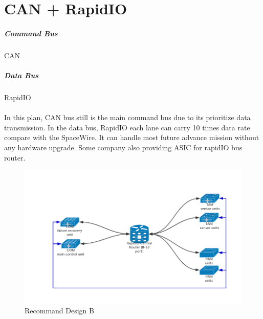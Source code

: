 \documentclass[12pt,article]{memoir}
\begin{document}
\section{CAN + RapidIO}
\subparagraph{Command Bus}CAN
\subparagraph{Data Bus}RapidIO\\\\
In this plan, CAN bus still is the main command bus due to its prioritize data transmission. In the data bus, RapidIO each lane can carry 10 times data rate compare with the SpaceWire. It can handle most future advance mission without any hardware upgrade. Some company also providing ASIC for rapidIO bus router.
\begin{figure}[htp]
\includegraphics[width=\textwidth]{DR00001_RapidIO.png}
 \caption{Recommand Design B}	
\end{figure}
\newpage
\end{document}

